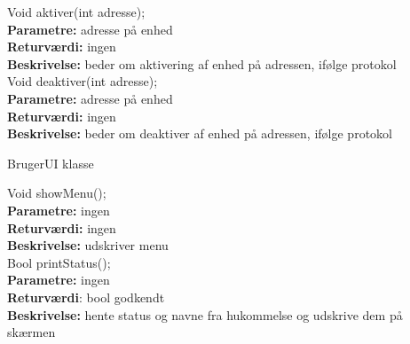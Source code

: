 Void aktiver(int adresse); \\
\textbf{Parametre:} adresse på enhed \\
\textbf{Returværdi:} ingen \\
\textbf{Beskrivelse:} beder om aktivering af enhed på adressen, ifølge protokol \\

Void deaktiver(int adresse); \\
\textbf{Parametre:} adresse på enhed \\
\textbf{Returværdi:} ingen \\
\textbf{Beskrivelse:} beder om deaktiver af enhed på adressen, ifølge protokol \\

{\centering 
BrugerUI klasse\par
}

Void showMenu(); \\
\textbf{Parametre:} ingen \\
\textbf{Returværdi:} ingen \\
\textbf{Beskrivelse:} udskriver menu \\

Bool printStatus(); \\
\textbf{Parametre:} ingen \\
\textbf{Returværdi}: bool godkendt \\
\textbf{Beskrivelse:} hente status og navne fra hukommelse og udskrive dem på skærmen \\












